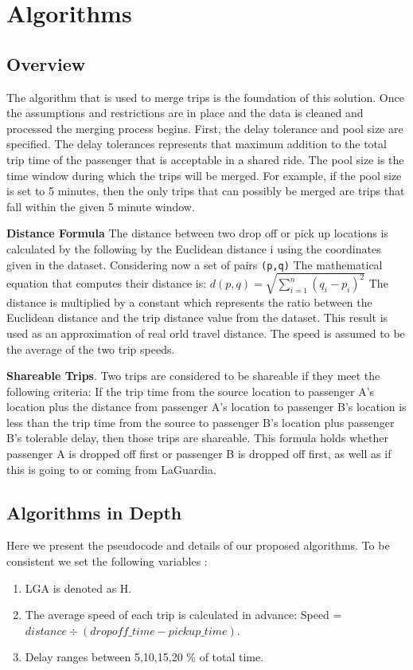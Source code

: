 \section{Algorithms}
\label{sec:algorithms}

\subsection{Overview}
The algorithm that is used to merge trips is the foundation of this solution. 
Once the assumptions and restrictions are in place and the data is cleaned and processed the merging process begins.  
First, the delay tolerance and pool size are specified.  The delay tolerances represents that maximum addition to the total trip time of the passenger that is acceptable in a shared ride.  The pool size is the time window during which the trips will be merged.  For example, if the pool size is set to 5 minutes, then the only trips that can possibly be merged are trips that fall within the given 5 minute window.  


\textbf{Distance Formula}
The distance between two drop off or pick up locations is calculated by the following by the  Euclidean distance i using the coordinates given in the dataset.  
Considering now a set of pairs \texttt{(p,q)}
The mathematical equation that computes their distance is:  
 $d\left( p,q\right)   = \sqrt {\sum _{i=1}^{n}  \left( q_{i}-p_{i}\right)^2 } $
The distance is multiplied by a constant which represents the ratio between the Euclidean distance and the trip distance value from the dataset.  
This result is used as an approximation of real orld travel distance.  
The speed is assumed to be the average of the two trip speeds.  

\textbf{Shareable Trips}.
Two trips are considered to be shareable if they meet the following criteria:
If the trip time from the source location to passenger A’s location plus the distance from passenger A's location to passenger B's location is less than the trip time from the source to passenger B's location plus passenger B’s tolerable delay, then those trips are shareable.  
This formula holds whether passenger A is dropped off first or passenger B is dropped off first, as well as if this is going to or coming from LaGuardia.

\subsection{Algorithms in Depth}
Here we present the pseudocode and details of our proposed algorithms.	
To be consistent  we set the following variables : 
\begin{enumerate}
\item LGA is denoted as H.
\item The average speed of each trip is calculated in advance:  Speed = $ distance \div (dropoff\_time-pickup\_time)$.
\item Delay  ranges between 5,10,15,20 \% of total time.\\

\end{enumerate}



